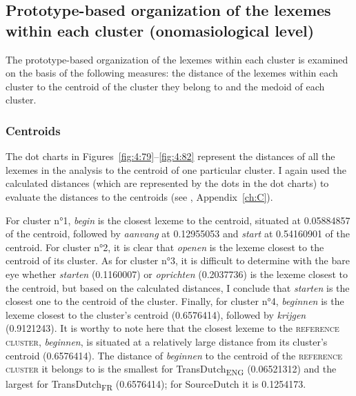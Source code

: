 \subsection{Prototype-based organization of the lexemes within each cluster (onomasiological level)}
\label{sec:4.4.3}  
The prototype-based organization of the lexemes within each cluster is examined on the basis of the following measures: the distance of the lexemes within each cluster to the centroid of the cluster they belong to and the medoid of each cluster.


\subsubsection{Centroids}
\label{sec:4.4.3.1}  
The dot charts in Figures~\ref{fig:4:79}--\ref{fig:4:82} represent the distances of all the lexemes in the analysis to the centroid of one particular cluster. I again used the calculated distances (which are represented by the dots in the dot charts) to evaluate the distances to the centroids (see , Appendix~\ref{ch:C}).

For cluster n°1, \textit{begin} is the closest lexeme to the centroid, situated at 0.05884857 of the centroid, followed by \textit{aanvang} at 0.12955053 and \textit{start} at 0.54160901 of the centroid. For cluster n°2, it is clear that \textit{openen} is the lexeme closest to the centroid of its cluster. As for cluster n°3, it is difficult to determine with the bare eye whether \textit{starten} (0.1160007) or \textit{oprichten} (0.2037736) is the lexeme closest to the centroid, but based on the calculated distances, I conclude that \textit{starten} is the closest one to the centroid of the cluster. Finally, for cluster n°4, \textit{beginnen} is the lexeme closest to the cluster’s centroid (0.6576414), followed by \textit{krijgen} (0.9121243). It is worthy to note here that the closest lexeme to the \textsc{reference cluster}, \textit{beginnen}, is situated at a relatively large distance from its cluster’s centroid (0.6576414). The distance of \textit{beginnen} to the centroid of the \textsc{reference cluster} it belongs to is the smallest for TransDutch\textsubscript{ENG} (0.06521312) and the largest for TransDutch\textsubscript{FR} (0.6576414); for SourceDutch it is 0.1254173.

